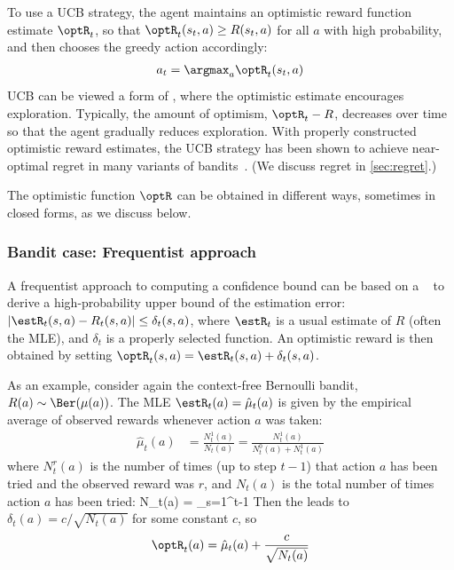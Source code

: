 To use a UCB strategy, the agent maintains an optimistic reward
function estimate $\optR_t$, so that $\optR_t(s_t,a) \ge R(s_t,a)$ for
all $a$ with high probability, and then chooses the greedy action
accordingly: 
\begin{align}
a_t = \argmax_a \optR_t(s_t,a)
\end{align}
UCB can be viewed a form of , where the optimistic
estimate encourages exploration.  Typically, the amount of optimism,
$\optR_t - R$, decreases over time so that the agent gradually reduces
exploration.  With properly constructed optimistic reward estimates,
the UCB strategy has been shown to achieve near-optimal regret in many
variants of bandits~\citep{Lattimore2019}.
(We discuss regret in \cref{sec:regret}.)

The optimistic function $\optR$ can be obtained in different ways,
sometimes in closed forms, as we discuss below.

\subsubsection{Bandit case: Frequentist approach}

A frequentist approach to computing a confidence bound
can be based on a
~\citep{Boucheron16} to derive a
high-probability upper bound of the estimation error: $|\estR_t(s,a) -
R_t(s,a)| \le \delta_t(s,a)$, where $\estR_t$ is a usual estimate of
$R$ (often the MLE), and $\delta_t$ is a properly selected function.
An optimistic reward is then obtained by setting 
$\optR_t(s,a) = \estR_t(s,a) + \delta_t(s,a)$.

As an example, consider again the context-free Bernoulli bandit,
$R(a) \sim \Ber(\mu(a))$.
The  MLE $\estR_t(a)=\hat{\mu}_t(a)$ is given by
the empirical average of observed rewards whenever action $a$ was taken:
\begin{align}
  \hat{\mu}_t(a) &= \frac{N_t^1(a)}{N_t(a)} = \frac{N_t^1(a)}{N_t^0(a) + N_t^1(a)}
  \label{eqn:dtheory-bandit-mlebernoulli} 
\end{align}
where $N_t^r(a)$ is the number of times (up to step $t-1$)
that action $a$ has been tried
and the observed reward was $r$,
and $N_t(a)$ is the total number of times action $a$ has been tried:
\be
N_t(a) = \sum_{s=1}^{t-1} 
\ee
Then the 
\citep{Boucheron16} leads to
$\delta_t(a) = c / \sqrt{N_t(a)}$
for some constant $c$, so
\begin{align}
  \optR_t(a) = \hat{\mu}_t(a) + \frac{c}{\sqrt{N_t(a)}}
  \label{eqn:UCBchernoff}
\end{align}

